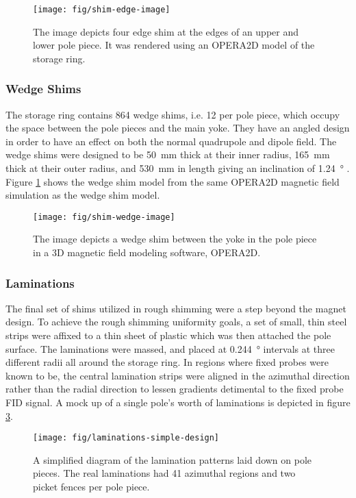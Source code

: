 \begin{figure}[h]
\centering
\texttt{[image: fig/shim-edge-image]}
\caption{
    The image depicts four edge shim at the edges of an upper and lower pole piece.  It was rendered using an OPERA2D model of the storage ring. 
    \label{fig:shim-edge-image}
}
\end{figure}

\subsubsection{Wedge Shims}
The storage ring contains 864 wedge shims, i.e. 12 per pole piece, which occupy the space between the pole pieces and the main yoke.  They have an angled design in order to have an effect on both the normal quadrupole and dipole field.  The wedge shims were designed to be \SI{50}{\mm} thick at their inner radius, \SI{165}{\mm} thick at their outer radius, and \SI{530}{\mm} in length giving an inclination of \SI{1.24}{\degree} \cite{danby-magnet}.  Figure \ref{fig:shim-edge-image} shows the wedge shim model from the same OPERA2D magnetic field simulation as the wedge shim model.

\begin{figure}[h]
\centering
\texttt{[image: fig/shim-wedge-image]}
\caption{
    The image depicts a wedge shim between the yoke in the pole piece in a 3D magnetic field modeling software, OPERA2D. 
    \label{fig:shim-wedge-image}
}
\end{figure}

\subsubsection{Laminations}
The final set of shims utilized in rough shimming were a step beyond the magnet design.  To achieve the rough shimming uniformity goals, a set of small, thin steel strips were affixed to a thin sheet of plastic which was then attached the pole surface.  The laminations were massed, and placed at \SI{0.244}{\degree} intervals at three different radii all around the storage ring.  In regions where fixed probes were known to be, the central lamination strips were aligned in the azimuthal direction rather than the radial direction to lessen gradients detimental to the fixed probe FID signal.  A mock up of a single pole's worth of laminations is depicted in figure \ref{fig:laminations-simple-design}.

\begin{figure}[h]
\centering
\texttt{[image: fig/laminations-simple-design]}
\caption{
    A simplified diagram of the lamination patterns laid down on pole pieces.  The real laminations had 41 azimuthal regions and two picket fences per pole piece. 
    \label{fig:laminations-simple-design}
}
\end{figure}


